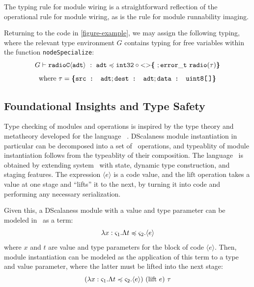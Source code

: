 The  typing rule for module wiring is a straightforward reflection of the
operational rule for module wiring, as is the  rule for module runnability
imaging.
\begin{example}
\label{example-scalanesstyping}
Returning to the code in \autoref{figure-example}, we may assign the following typing, where the
relevant type environment $G$ contains typing for free variables within the function
\texttt{nodeSpecialize}:
$$
  G \vdash \mathtt{radioC\langle adt \rangle}\ :\  
    \texttt{adt} \preccurlyeq \texttt{int32} \circ \mathrm{<}\mathrm{>}\textup{\textbf{\{}}\ ;
      \mathtt{error\_t\ radio(\tau)} \textup{\textbf{\}}}
$$
$$
\text{where}\ \tau = \textup{\textbf{\{}} \texttt{src : adt}; \texttt{dest : adt}; \texttt{data : uint8[\,]} \textup{\textbf{\}}} 
$$
\end{example}

\subsection{Foundational Insights and Type Safety} 
\label{section-framedml}


Type checking of modules and operations is inspired by the type theory and metatheory developed
for the language \fml\ \cite{FramedML}. DScalaness module instantiation in particular can be
decomposed into a set of \fml\ operations, and typeablity of module instantiation follows from
the typeablity of their composition. The language \fml\ is obtained by extending system \fsub\
with state, dynamic type construction, and staging features. The expression $\langle e \rangle$
is a code value, and the $\mathrm{lift}$ operation takes a value at one stage and ``lifts'' it
to the next, by turning it into code and performing any necessary serialization.

Given this, a DScalaness module with a value and type parameter can be
modeled in \fml\ as a term: 
$$\lambda x : \varsigma_1 . \Lambda t \preccurlyeq \varsigma_2 . \langle e \rangle$$
where $x$ and $t$ are value and type parameters for the block of code $\langle e \rangle$. Then,
module instantiation can be modeled as the application of this term to a type and value
parameter, where the latter must be lifted into the next stage:
$$
(\lambda x : \s_1 . \Lambda t \subtype \s_2 . \langle e \rangle)\ (\mathrm{lift}\ e)\ \t
$$ 

